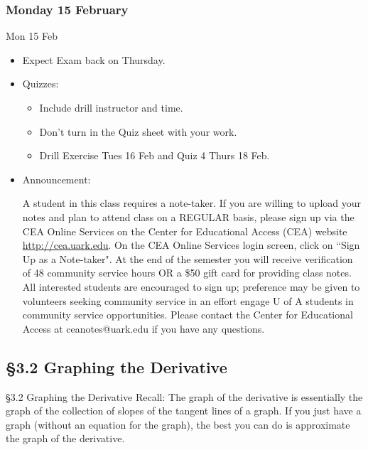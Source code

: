 \documentclass[cal1spr16Lectures.tex]{subfiles}
\begin{document}

\subsubsection{\bf Monday 15 February}
\begin{frame}[allowframebreaks]{Mon 15 Feb}
\begin{itemize}\footnotesize
\item Expect Exam back on Thursday.
\item Quizzes: 
\begin{itemize}\footnotesize
	\item Include drill instructor and time.
	\item Don't turn in the Quiz sheet with your work.
	\item Drill Exercise Tues 16 Feb and Quiz 4 Thurs 18 Feb.
\end{itemize}
\framebreak
\item  Announcement: 

\alert{A student in this class requires a note-taker. If you are willing to upload your notes and plan to attend class on a REGULAR basis, please sign up via the CEA Online Services on the Center for Educational Access (CEA) website \url{http://cea.uark.edu}. On the CEA Online Services login screen, click on ``Sign Up as a Note-taker". At the end of the semester you will receive verification of 48 community service hours OR a \$50 gift card for providing class notes. All interested students are encouraged to sign up; preference may be given to volunteers seeking community service in an effort engage U of A students in community service opportunities. Please contact the Center for Educational Access at ceanotes@uark.edu if you have any questions.}

\end{itemize}
\end{frame}

\subsection[3.2 Graphing the Derivative]{\S 3.2 Graphing the Derivative}

\begin{frame}{\S 3.2 Graphing the Derivative}
Recall: The graph of the derivative is essentially the graph of the collection of slopes of the tangent lines of a graph.  If you just have a graph (without an equation for the graph), the best you can do is approximate the graph of the derivative.
\end{frame}
\end{document}

